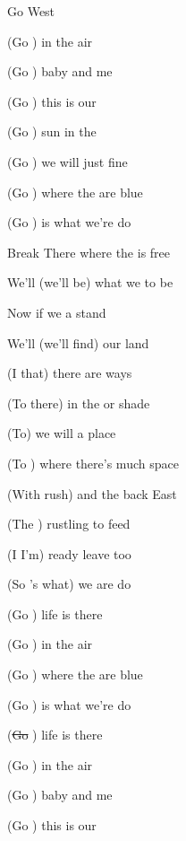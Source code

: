 \begin{SBSong}{Go West}
\begin{SBChorus}
    (Go ) in the  air
    
    (Go ) baby  and me

    (Go ) this is our 

    (Go ) sun in the 

    (Go ) we will  just fine

    (Go ) where the  are blue

    (Go ) is what we're  do
  \end{SBChorus}
  \begin{SBBracket}{Break}
     There where the  is free
    
    We'll  (we'll be)  what we  to be

     Now if we  a stand

    We'll  (we'll find) our  land
  \end{SBBracket}
  \begin{SBVerse}
    (I  that) there are  ways

    (To  there) in the  or shade

    (To) we will  a place

    (To ) where there's  much space

    (With rush) and the  back East

    (The ) rustling  to feed
 
    (I  I'm) ready  leave too

    (So 's what) we are  do
  \end{SBVerse}
  
  \begin{SBChorus}
    (Go ) life is  there

    (Go ) in the  air
    
    (Go ) where the  are blue

    (Go ) is what we're  do
    
    (\sout{Go }) life is  there

    (Go ) in the  air

    (Go ) baby  and me

    (Go ) this is our 
  \end{SBChorus}
\end{SBSong}
